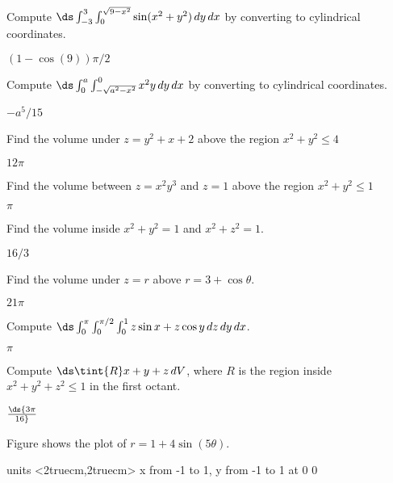\begin{exercises}
\exercise Compute $\ds \int_{-3}^3\int_0^{\sqrt{9-x^2}}
\sin(x^2+y^2)\,dy\,dx$ by converting to cylindrical coordinates.
\begin{answer} $(1-\cos(9))\pi/2$
\end{answer}

\exercise Compute $\ds \int_{0}^a\int_{-\sqrt{a^2-x^2}}^0 x^2y\,dy\,dx$ 
by converting to cylindrical coordinates.
\begin{answer} $-a^5/15$
\end{answer}



\exercise Find the volume under $z=y^2+x+2$ above
the region $x^2+y^2\le 4$
\begin{answer} $12\pi$
\end{answer}

\exercise Find the volume between
$z=x^2y^3$ and $z=1$ above
the region $x^2+y^2\le 1$
\begin{answer} $\pi$
\end{answer}

\exercise Find the volume inside
$x^2+y^2=1$ and $x^2+z^2=1$.
\begin{answer} $16/3$
\end{answer}


\exercise Find the volume under $z=r$ above $r=3+\cos\theta$.
\begin{answer} $21\pi$
\end{answer}

\exercise Compute $\ds
\int_0^\pi\int_0^{\pi/2}\int_0^1 z\sin x+z\cos y\,dz\,dy\,dx$.
\begin{answer} $\pi$
\end{answer}

\exercise Compute $\ds
\tint{R} x+y+z\,dV$, where $R$ is the region inside
$x^2+y^2+z^2\le 1$ in the first octant.
\begin{answer} $\ds {3\pi\over16}$
\end{answer}

\exercise Figure  shows the plot of
$r=1+4\sin(5\theta)$.

\figure
\vbox{\beginpicture
\normalgraphs
\ninepoint
\setcoordinatesystem units <2truecm,2truecm>
\setplotarea x from -1 to 1, y from -1 to 1
 at 0 0
\endpicture}


\end{exercises}
